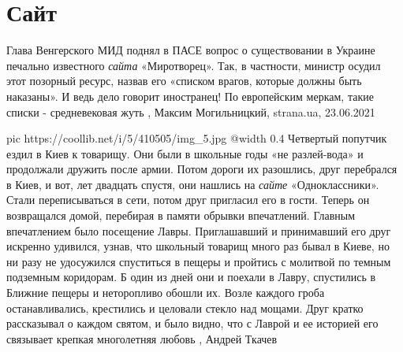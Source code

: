  
 
 
 
 
\chapter{Сайт}
\label{sec:slova.sajt}

Глава Венгерского МИД поднял в ПАСЕ вопрос о существовании в Украине печально
известного \emph{сайта} «Миротворец». Так, в частности, министр осудил этот
позорный ресурс, назвав его «списком врагов, которые должны быть наказаны». И
ведь дело говорит иностранец! По европейским меркам, такие списки -
средневековая жуть
, 
Максим Могильницкий, strana.ua, 23.06.2021

\ifcmt
  pic https://coollib.net/i/5/410505/img_5.jpg
  @width 0.4
\fi
Четвертый попутчик ездил в Киев к товарищу. Они были в школьные годы «не
разлей-вода» и продолжали дружить после армии. Потом дороги их разошлись, друг
перебрался в Киев, и вот, лет двадцать спустя, они нашлись на \emph{сайте}
«Одноклассники». Стали переписываться в сети, потом друг пригласил его в гости.
Теперь он возвращался домой, перебирая в памяти обрывки впечатлений. Главным
впечатлением было посещение Лавры. Приглашавший и принимавший его друг искренно
удивился, узнав, что школьный товарищ много раз бывал в Киеве, но ни разу не
удосужился спуститься в пещеры и пройтись с молитвой по темным подземным
коридорам. Б один из дней они и поехали в Лавру, спустились в Ближние пещеры и
неторопливо обошли их. Возле каждого гроба останавливались, крестились и
целовали стекло над мощами. Друг кратко рассказывал о каждом святом, и было
видно, что с Лаврой и ее историей его связывает крепкая многолетняя любовь
, Андрей Ткачев


